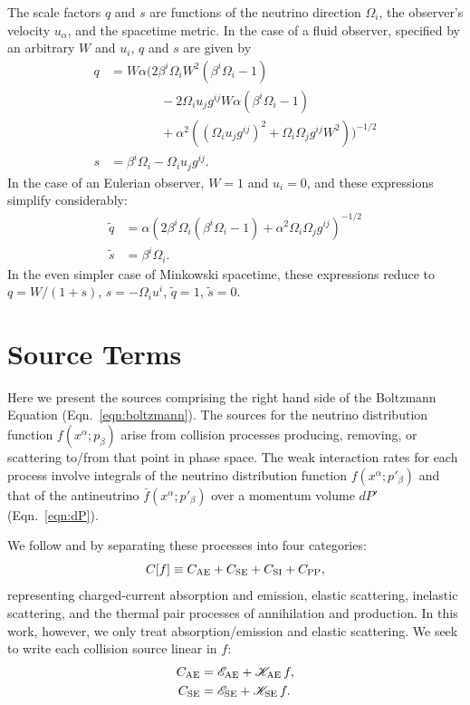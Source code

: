 \documentclass[aps,floatfix,prd,superscriptaddress,twocolumn]{revtex4-1}
\begin{document}
The scale factors $q$ and $s$ are functions of the neutrino
direction $\Omega_i$, the observer's velocity $u_\alpha$,
and the spacetime metric.
In the case of a fluid observer, specified by an arbitrary $W$ and $u_i$,
$q$ and $s$ are given by
\begin{align}
  \label{eqn:q_general}
  q
  &= W\alpha\Bigg(2\beta^i\Omega_i W^2(\beta^i\Omega_i-1) \nonumber\\
  &\qquad\qquad - 2\Omega_i u_j g^{ij} W \alpha(\beta^i\Omega_i-1)\nonumber\\
  &\qquad\qquad + \alpha^2\left((\Omega_i u_j g^{ij})^2+\Omega_i\Omega_j g^{ij}W^2\right)\Bigg)^{-1/2}\\
  \label{eqn:s_general}
  s
  &= \beta^i\Omega_i -\Omega_i u_j g^{ij}.
\end{align}
In the case of an Eulerian observer, $W=1$ and $u_i=0$,
and these expressions simplify considerably:
\begin{align}
  \label{eqn:q_eulerian}
  \tilde{q}
  &= \alpha\left(2\beta^i\Omega_i(\beta^i\Omega_i-1)+\alpha^2\Omega_i\Omega_j g^{ij}\right)^{-1/2}\\
  \label{eqn:s_eulerian}
  \tilde{s}
  &= \beta^i\Omega_i.
\end{align}
In the even simpler case of Minkowski spacetime, these expressions
reduce to $q=W/(1+s)$, $s=-\Omega_i u^i$,
$\tilde{q}=1$, $\tilde{s}=0$.

\section{Source Terms}
\label{sec:source_terms}
Here we present the sources comprising the right hand side of the
Boltzmann Equation (Eqn.~\ref{eqn:boltzmann}). The sources for the neutrino
distribution function $f(x^\alpha;p_\beta)$ arise from collision processes
producing, removing, or scattering to/from that point in phase space.
The weak interaction rates for each process involve integrals of
the neutrino distribution function $f(x^\alpha;p'_\beta)$ and that of the
antineutrino $\bar{f}(x^\alpha;p'_\beta)$ over a momentum volume
$dP'$ (Eqn.~\ref{eqn:dP}).

We follow
\cite{brue1985-core_collapse} and \cite[Sec.~4]{shib2011-truncated_moment}
by separating these processes into four categories:
\begin{equation}
  \label{eqn:four_sources}
  C[f] \equiv C_{\rm AE} + C_{\rm SE} + C_{\rm SI} + C_{\rm PP},
\end{equation}
representing charged-current absorption and emission, elastic scattering,
inelastic scattering, and the thermal pair processes of annihilation and
production. In this work, however, we only treat absorption/emission
and elastic scattering.
We seek to write each collision source linear in $f$:
\begin{align}
  \label{eqn:sources_cae}
  C_{\rm AE}
  &= \mathscr{E}_{\rm AE} + \mathscr{K}_{\rm AE}\, f, \\
  \label{eqn:sources_cse}
  C_{\rm SE}
  &= \mathscr{E}_{\rm SE} + \mathscr{K}_{\rm SE}\, f.
\end{align}
\end{document}
